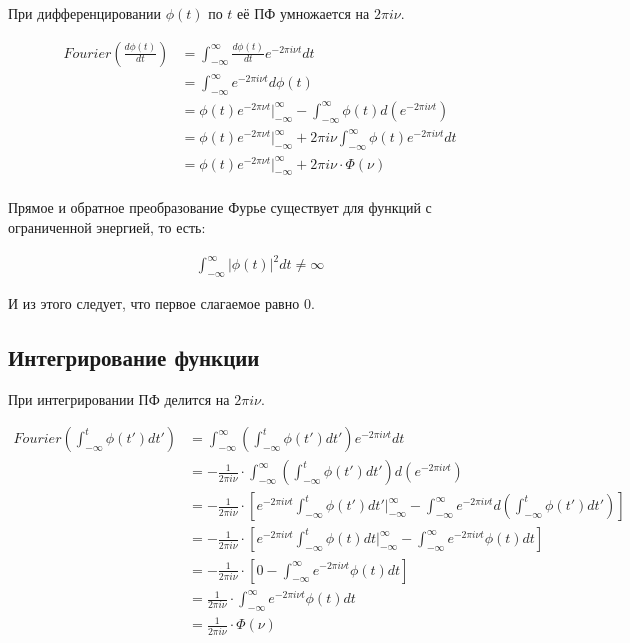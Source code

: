 \documentclass[a4paper,12pt]{report}
\begin{document}
При дифференцировании $\phi(t)$ по $t$ её ПФ умножается на $2\pi i \nu$.

\[
    \begin{aligned}
        Fourier\left(\frac{d\phi(t)}{dt}\right) 
        &= \int_{-\infty}^{\infty} \frac{d\phi(t)}{dt} e^{-2\pi i\nu t} dt \\
        &= \int_{-\infty}^{\infty} e^{-2\pi i\nu t} d\phi(t) \\
        &= \phi(t) e^{-2\pi\nu t} \bigg|_{-\infty}^{\infty} - \int_{-\infty}^{\infty} \phi(t) d\left(e^{-2\pi i\nu t}\right) \\
        &= \phi(t) e^{-2\pi\nu t} \bigg|_{-\infty}^{\infty} + 2\pi i\nu \int_{-\infty}^{\infty} \phi(t) e^{-2\pi i\nu t} dt \\
        &= \phi(t) e^{-2\pi\nu t} \bigg|_{-\infty}^{\infty} + 2\pi i\nu \cdot \Phi(\nu) \\
    \end{aligned}
\]

Прямое и обратное преобразование Фурье существует для функций с ограниченной энергией, то есть:

\[
    \begin{aligned}
        \int_{-\infty}^{\infty} |\phi(t)|^2 dt \neq \infty
    \end{aligned}
\]

И из этого следует, что первое слагаемое равно 0.

\subsection{Интегрирование функции}

При интегрировании ПФ делится на $2\pi i \nu$.

\[
    \begin{aligned}
        Fourier\left(\int_{-\infty}^{t} \phi(t') dt'\right) 
        &= \int_{-\infty}^{\infty} \left( \int_{-\infty}^{t} \phi(t') dt' \right) e^{-2\pi i\nu t} dt \\
        &= -\frac{1}{2\pi i\nu} \cdot \int_{-\infty}^{\infty} \left( \int_{-\infty}^{t} \phi(t') dt' \right) d\left(e^{-2\pi i\nu t}\right) \\
        &= -\frac{1}{2\pi i\nu} \cdot \left[ e^{-2\pi i\nu t} \int_{-\infty}^{t} \phi(t') dt' \biggr|_{-\infty}^{\infty} - \int_{-\infty}^{\infty} e^{-2\pi i\nu t} d\left(\int_{-\infty}^{t} \phi(t') dt'\right)\right] \\
        &= -\frac{1}{2\pi i\nu} \cdot \left[ e^{-2\pi i\nu t} \int_{-\infty}^{t} \phi(t) dt \biggr|_{-\infty}^{\infty} - \int_{-\infty}^{\infty} e^{-2\pi i\nu t} \phi(t) dt\right] \\
        &= -\frac{1}{2\pi i\nu} \cdot \left[ 0 - \int_{-\infty}^{\infty} e^{-2\pi i\nu t} \phi(t) dt\right] \\
        &= \frac{1}{2\pi i\nu} \cdot \int_{-\infty}^{\infty} e^{-2\pi i\nu t} \phi(t) dt \\
        &= \frac{1}{2\pi i\nu} \cdot \Phi(\nu)
    \end{aligned}
\]
\end{document}
